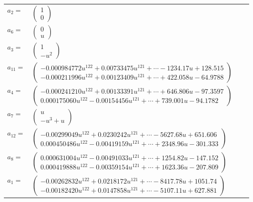 \documentclass[1p]{elsarticle_modified}
\theoremstyle{definition}
\begin{document}
\begin{tabular}{m{7pt} m{180pt} m{7pt} m{180pt} }
\flushright $a_{2}=$&$\begin{pmatrix}1\\0\end{pmatrix}$ \\
\flushright $a_{6}=$&$\begin{pmatrix}0\\u\end{pmatrix}$ \\
\flushright $a_{3}=$&$\begin{pmatrix}1\\- u^2\end{pmatrix}$ \\
\flushright $a_{11}=$&$\begin{pmatrix}-0.000984772 u^{122}+0.00733475 u^{121}+\cdots-1234.17 u+128.515\\-0.000211996 u^{122}+0.00123409 u^{121}+\cdots+422.058 u-64.9788\end{pmatrix}$ \\
\flushright $a_{4}=$&$\begin{pmatrix}-0.000241210 u^{122}+0.00133391 u^{121}+\cdots+646.806 u-97.3597\\0.000175060 u^{122}-0.00154456 u^{121}+\cdots+739.001 u-94.1782\end{pmatrix}$ \\
\flushright $a_{7}=$&$\begin{pmatrix}u\\- u^3+u\end{pmatrix}$ \\
\flushright $a_{12}=$&$\begin{pmatrix}-0.00299049 u^{122}+0.0230242 u^{121}+\cdots-5627.68 u+651.606\\0.000450486 u^{122}-0.00419159 u^{121}+\cdots+2348.96 u-301.333\end{pmatrix}$ \\
\flushright $a_{8}=$&$\begin{pmatrix}0.000631004 u^{122}-0.00491033 u^{121}+\cdots+1254.82 u-147.152\\0.000419888 u^{122}-0.00359154 u^{121}+\cdots+1623.36 u-207.809\end{pmatrix}$ \\
\flushright $a_{1}=$&$\begin{pmatrix}-0.00262832 u^{122}+0.0218172 u^{121}+\cdots-8417.78 u+1051.74\\-0.00182420 u^{122}+0.0147858 u^{121}+\cdots-5107.11 u+627.881\end{pmatrix}$ \\

\end{tabular}
\end{document}

